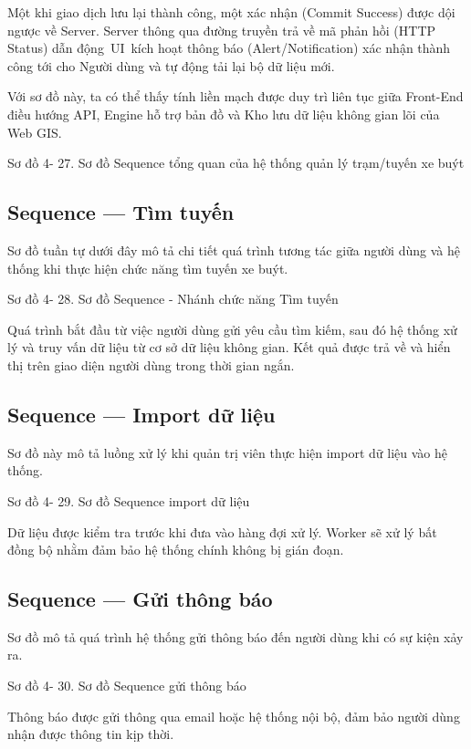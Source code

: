 \documentclass[13pt,a4paper]{report}
\begin{document}
Một khi giao dịch lưu lại thành công, một xác nhận (Commit Success) được dội ngược về Server. Server thông qua đường truyền trả về mã phản hồi (HTTP Status) dẫn động UI kích hoạt thông báo (Alert/Notification) xác nhận thành công tới cho Người dùng và tự động tải lại bộ dữ liệu mới.

Với sơ đồ này, ta có thể thấy tính liền mạch được duy trì liên tục giữa Front-End điều hướng API, Engine hỗ trợ bản đồ và Kho lưu dữ liệu không gian lõi của Web GIS.

Sơ đồ 4- 27. Sơ đồ Sequence tổng quan của hệ thống quản lý trạm/tuyến xe buýt

\subsection{Sequence — Tìm tuyến}

Sơ đồ tuần tự dưới đây mô tả chi tiết quá trình tương tác giữa người dùng và hệ thống khi thực hiện chức năng tìm tuyến xe buýt.

Sơ đồ 4- 28. Sơ đồ Sequence - Nhánh chức năng Tìm tuyến

Quá trình bắt đầu từ việc người dùng gửi yêu cầu tìm kiếm, sau đó hệ thống xử lý và truy vấn dữ liệu từ cơ sở dữ liệu không gian. Kết quả được trả về và hiển thị trên giao diện người dùng trong thời gian ngắn.

\subsection{Sequence — Import dữ liệu}

Sơ đồ này mô tả luồng xử lý khi quản trị viên thực hiện import dữ liệu vào hệ thống.

Sơ đồ 4- 29. Sơ đồ Sequence import dữ liệu

Dữ liệu được kiểm tra trước khi đưa vào hàng đợi xử lý. Worker sẽ xử lý bất đồng bộ nhằm đảm bảo hệ thống chính không bị gián đoạn.

\subsection{Sequence — Gửi thông báo}

Sơ đồ mô tả quá trình hệ thống gửi thông báo đến người dùng khi có sự kiện xảy ra.

Sơ đồ 4- 30. Sơ đồ Sequence gửi thông báo

Thông báo được gửi thông qua email hoặc hệ thống nội bộ, đảm bảo người dùng nhận được thông tin kịp thời.
\end{document}
